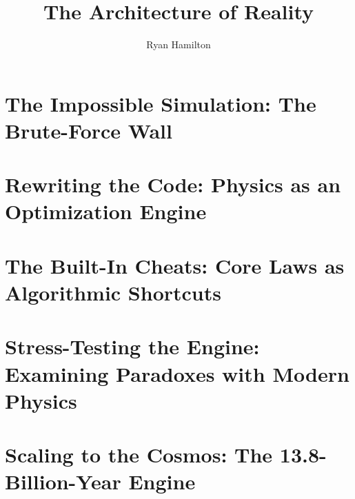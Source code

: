 \documentclass[11pt,oneside]{book}
\title{The Architecture of Reality}
\author{Ryan Hamilton}
\date{}
\begin{document}
\frontmatter





\tableofcontents



\mainmatter

\part{The Impossible Simulation: The Brute-Force Wall}




\part{Rewriting the Code: Physics as an Optimization Engine}




\part{The Built-In Cheats: Core Laws as Algorithmic Shortcuts}




\part{Stress-Testing the Engine: Examining Paradoxes with Modern Physics}




\part{Scaling to the Cosmos: The 13.8-Billion-Year Engine}






\backmatter



\end{document}
